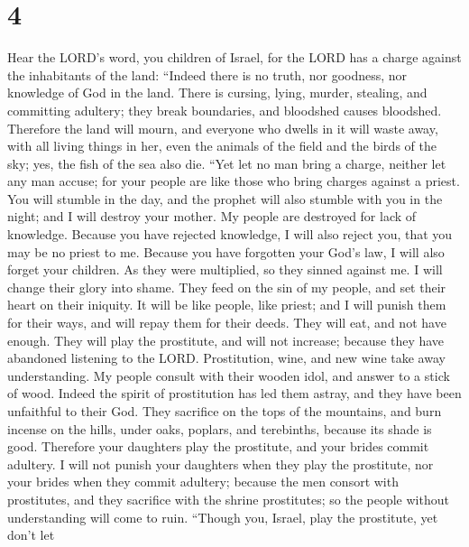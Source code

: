 \hypertarget{section-3}{%
\section{4}\label{section-3}}

 Hear the LORD's word, you children of Israel, for the
LORD has a charge against the inhabitants of the land: ``Indeed there is
no truth, nor goodness, nor knowledge of God in the land. 
There is cursing, lying, murder, stealing, and committing adultery; they
break boundaries, and bloodshed causes bloodshed. 
Therefore the land will mourn, and everyone who dwells in it will waste
away, with all living things in her, even the animals of the field and
the birds of the sky; yes, the fish of the sea also die. 
``Yet let no man bring a charge, neither let any man accuse; for your
people are like those who bring charges against a priest. 
You will stumble in the day, and the prophet will also stumble with you
in the night; and I will destroy your mother.  My people
are destroyed for lack of knowledge. Because you have rejected
knowledge, I will also reject you, that you may be no priest to me.
Because you have forgotten your God's law, I will also forget your
children.  As they were multiplied, so they sinned against
me. I will change their glory into shame.  They feed on
the sin of my people, and set their heart on their iniquity.
 It will be like people, like priest; and I will punish
them for their ways, and will repay them for their deeds.
 They will eat, and not have enough. They will play the
prostitute, and will not increase; because they have abandoned listening
to the LORD.  Prostitution, wine, and new wine take away
understanding.  My people consult with their wooden idol,
and answer to a stick of wood. Indeed the spirit of prostitution has led
them astray, and they have been unfaithful to their God. 
They sacrifice on the tops of the mountains, and burn incense on the
hills, under oaks, poplars, and terebinths, because its shade is good.
Therefore your daughters play the prostitute, and your brides commit
adultery.  I will not punish your daughters when they
play the prostitute, nor your brides when they commit adultery; because
the men consort with prostitutes, and they sacrifice with the shrine
prostitutes; so the people without understanding will come to ruin.
 ``Though you, Israel, play the prostitute, yet don't let
